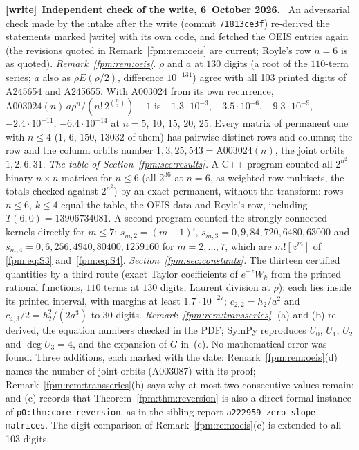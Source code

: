\documentclass[11pt]{article}
\theoremstyle{definition}\newtheorem{definition}[theorem]{Definition}
\theoremstyle{remark}\newtheorem{remark}[theorem]{Remark}
\newcommand{\file}[1]{\nolinkurl{#1}}
\newenvironment{writenote}[1][]{\par\smallskip\begingroup\small
 \noindent\textbf{[write]}\if\relax\detokenize{#1}\relax\else~\textbf{#1.}\fi\ }%
 {\par\endgroup\smallskip}
\begin{document}
\begin{writenote}[Independent check of the write, 6~October 2026]
An adversarial check made by the intake after the write (commit
\file{71813ce3f}) re-derived the statements marked [write] with its own
code, and fetched the OEIS entries again (the revisions quoted in
Remark~\ref{fpm:rem:oeis} are current; Royle's row $n=6$ is as quoted).
\emph{Remark~\ref{fpm:rem:oeis}.} $\rho$ and $a$ at $130$ digits (a root
of the $110$-term series; $a$ also as $\rho E(\rho/2)$, difference
$10^{-131}$) agree with all 103 printed digits of A245654 and A245655. With
A003024 from its own recurrence, $\mathrm{A003024}(n)\,a\rho^n/(n!\,2^{\binom
n2})-1$ is $-1.3\cdot10^{-3}$, $-3.5\cdot10^{-6}$, $-9.3\cdot10^{-9}$,
$-2.4\cdot10^{-11}$, $-6.4\cdot10^{-14}$ at $n=5$, $10$, $15$, $20$, $25$.
Every matrix of permanent one with $n\le4$ ($1$, $6$, $150$, $13032$ of
them) has pairwise distinct rows and columns; the row and the column orbits
number $1,3,25,543=\mathrm{A003024}(n)$, the joint orbits $1,2,6,31$.
\emph{The table of Section~\ref{fpm:sec:results}.} A C++ program counted
all $2^{n^2}$ binary $n\times n$ matrices for $n\le6$ (all $2^{36}$ at
$n=6$, as weighted row multisets, the totals checked against $2^{n^2}$) by
an exact permanent, without the transform: rows $n\le6$, $k\le4$ equal the
table, the OEIS data and Royle's row, including $T(6,0)=13906734081$. A
second program counted the strongly connected kernels directly for $m\le7$:
$s_{m,2}=(m-1)!$, $s_{m,3}=0,9,84,720,6480,63000$ and
$s_{m,4}=0,6,256,4940,80400,1259160$ for $m=2,\dots,7$, which are
$m![z^m]$ of \eqref{fpm:eq:S3} and~\eqref{fpm:eq:S4}.
\emph{Section~\ref{fpm:sec:constants}.} The thirteen certified quantities
by a third route (exact Taylor coefficients of $e^{-z}W_k$ from the printed
rational functions, $110$ terms at $130$ digits, Laurent division at $\rho$):
each lies inside its printed interval, with margins at least
$1.7\cdot10^{-27}$; $c_{2,2}=h_2/a^2$ and $c_{4,3}/2=h_2^2/(2a^3)$ to $30$
digits. \emph{Remark~\ref{fpm:rem:transseries}.} (a) and (b) re-derived,
the equation numbers checked in the PDF; SymPy reproduces $U_0$, $U_1$,
$U_2$ and $\deg U_3=4$, and the expansion of $G$ in~(c). No mathematical
error was found. Three additions, each marked with the date:
Remark~\ref{fpm:rem:oeis}(d) names the number of joint orbits (A003087)
with its proof; Remark~\ref{fpm:rem:transseries}(b) says why at most two
consecutive values remain; and (c) records that
Theorem~\ref{fpm:thm:reversion} is also a direct formal instance of
\file{p0:thm:core-reversion}, as in the sibling report
\file{a222959-zero-slope-matrices}. The digit comparison of
Remark~\ref{fpm:rem:oeis}(c) is extended to all 103 digits.
\end{writenote}
\end{document}
